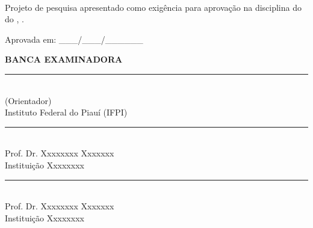 \begin{titlepage}
    \centering
    \MakeUppercase{\titulo}
    
    \vspace{4cm}
    
    \MakeUppercase{\textbf{\titulo}}\\
    
    \vspace{3cm}
    
    \begin{flushright}
        \begin{minipage}{8cm}
            \singlespacing
            Projeto de pesquisa apresentado como exigência para aprovação na disciplina \disciplina do \curso do \instituicao, \campus.
        \end{minipage}
    \end{flushright}
    
    \vspace{1cm}
    
    Aprovada em: \_\_\_/\_\_\_/\_\_\_\_\_\_
    
    \vspace{1.5cm}
    
    \textbf{BANCA EXAMINADORA}
    
    \vspace{1cm}
    
    \rule{10cm}{0.4pt}\\
    \orientador (Orientador) \\
    Instituto Federal do Piauí (IFPI)
    
    \vspace{1cm}
    
    \rule{10cm}{0.4pt}\\
    Prof. Dr. Xxxxxxxx Xxxxxxx \\
    Instituição Xxxxxxxx
    
    \vspace{1cm}
    
    \rule{10cm}{0.4pt}\\
    Prof. Dr. Xxxxxxxx Xxxxxxx \\
    Instituição Xxxxxxxx
    
    \vfill
\end{titlepage}